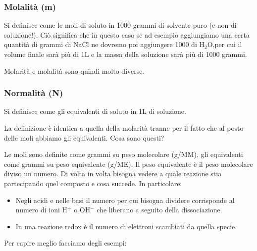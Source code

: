 \subsubsection{Molalità (m)}
Si definisce come le moli di soluto in 1000 grammi di solvente puro (e non di soluzione!). Ciò significa che in questo caso se ad esempio aggiungiamo una certa quantità di grammi di NaCl ne dovremo poi aggiungere 1000 di H$_2$O,per cui il volume finale sarà più di 1L e la massa della soluzione sarà più di 1000 grammi.

Molarità e molalità sono quindi molto diverse.
\subsubsection{Normalità (N)}
Si definisce come gli equivalenti di soluto in 1L di soluzione.

La definizione è identica a quella della molarità tranne per il fatto che al posto delle moli abbiamo gli equivalenti. Cosa sono questi?

Le moli sono definite come grammi su peso molecolare (g/MM), gli equivalenti come grammi su peso equivalente (g/ME). Il peso equivalente è il peso molecolare diviso un numero. Di volta in volta bisogna vedere a quale reazione stia partecipando quel composto e cosa succede. In particolare:
\begin{itemize}
    \item Negli acidi e nelle basi il numero per cui bisogna dividere corrisponde al numero di ioni H$^+$ o OH$^-$ che liberano a seguito della dissociazione.
    \item In una reazione redox è il numero di elettroni scambiati da quella specie.
\end{itemize}

Per capire meglio facciamo degli esempi:

